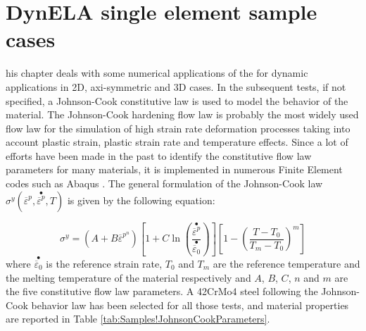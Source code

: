 %
%
%
\chapter{DynELA single element sample cases}

\startcontents[chapters]
\printmyminitoc[2]his chapter deals with some numerical applications of
the \DynELA for dynamic applications in 2D, axi-symmetric and 3D
cases. In the subsequent tests, if not specified, a Johnson-Cook constitutive
law is used to model the behavior of the material. The Johnson-Cook
hardening flow law is probably the most widely used flow law for the
simulation of high strain rate deformation processes taking into account
plastic strain, plastic strain rate and temperature effects. Since
a lot of efforts have been made in the past to identify the constitutive
flow law parameters for many materials, it is implemented in numerous
Finite Element codes such as Abaqus \cite{abaqus20146}. The general
formulation of the Johnson-Cook law $\sigma^{y}(\overline{\varepsilon}^{p},\stackrel{\bullet}{\overline{\varepsilon}^{p}},T)$
is given by the following equation:

\begin{equation}
\sigma^{y}=\left(A+B\overline{\varepsilon}^{p^{n}}\right)\left[1+C\ln\left(\frac{\stackrel{\bullet}{\overline{\varepsilon}^{p}}}{\stackrel{\bullet}{\overline{\varepsilon}_{0}}}\right)\right]\left[1-\left(\frac{T-T_{0}}{T_{m}-T_{0}}\right)^{m}\right]\label{eq:Samples!Johnson-Cook}
\end{equation}
where $\stackrel{\bullet}{\overline{\varepsilon}_{0}}$ is the reference
strain rate, $T_{0}$ and $T_{m}$ are the reference temperature and
the melting temperature of the material respectively and $A$, $B$,
$C$, $n$ and $m$ are the five constitutive flow law parameters.
A 42CrMo4 steel following the Johnson-Cook behavior law has been selected
for all those tests, and material properties are reported in Table
\ref{tab:Samples!JohnsonCookParameters}.

